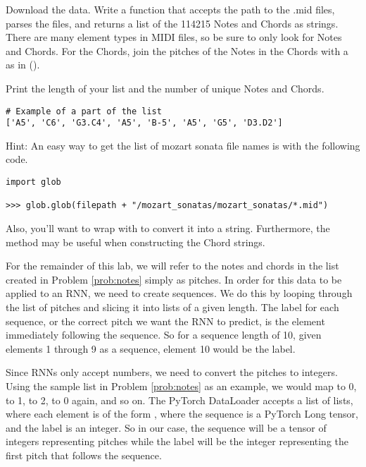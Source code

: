 \begin{problem}
Download the data.
Write a function that accepts the path to the .mid files, parses the files, and returns a list of the 114215 Notes and Chords as strings. 
There are many element types in MIDI files, so be sure to only look for Notes and Chords.
For the Chords, join the pitches of the Notes in the Chords with a  as in ().

Print the length of your list and the number of unique Notes and Chords.

\begin{lstlisting}
# Example of a part of the list
['A5', 'C6', 'G3.C4', 'A5', 'B-5', 'A5', 'G5', 'D3.D2']
\end{lstlisting}
Hint: An easy way to get the list of mozart sonata file names is with the following code.
\begin{lstlisting}
import glob

>>> glob.glob(filepath + "/mozart_sonatas/mozart_sonatas/*.mid")
\end{lstlisting}
Also, you'll want to wrap  with  to convert it into a string.
Furthermore, the  method may be useful when constructing the Chord strings.

\label{prob:notes}
\end{problem}

For the remainder of this lab, we will refer to the notes and chords in the list created in Problem \ref{prob:notes} simply as pitches.
In order for this data to be applied to an RNN, we need to create sequences.
We do this by looping through the list of pitches and slicing it into lists of a given length.
The label for each sequence, or the correct pitch we want the RNN to predict, is the element immediately following the sequence.
So for a sequence length of 10, given elements 1 through 9 as a sequence, element 10 would be the label.

Since RNNs only accept numbers, we need to convert the pitches to integers.
Using the sample list in Problem \ref{prob:notes} as an example, we would map  to 0,  to 1,  to 2,  to 0 again, and so on.
The PyTorch DataLoader accepts a list of lists, where each element is of the form , where the sequence is a PyTorch Long tensor, and the label is an integer.
So in our case, the sequence will be a tensor of integers representing pitches while the label will be the integer representing the first pitch that follows the sequence.

